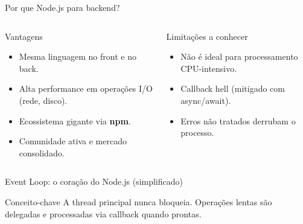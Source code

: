 \documentclass[aspectratio=169]{beamer}
\begin{document}
\begin{frame}{Por que Node.js para backend?}
\begin{columns}[T]
\begin{block}{Vantagens}
\begin{itemize}
  \item Mesma linguagem no front e no back.
  \item Alta performance em opera\c{c}\~oes I/O (rede, disco).
  \item Ecossistema gigante via \textbf{npm}.
  \item Comunidade ativa e mercado consolidado.
\end{itemize}
\end{block}
\begin{block}{Limita\c{c}\~oes a conhecer}
\begin{itemize}
  \item N\~ao \'{e} ideal para processamento CPU-intensivo.
  \item Callback hell (mitigado com async/await).
  \item Erros n\~ao tratados derrubam o processo.
\end{itemize}
\end{block}
\end{columns}
\end{frame}

\begin{frame}{Event Loop: o cora\c{c}\~ao do Node.js (simplificado)}
\begin{center}
\end{center}
\vspace{0.3em}
\begin{alertblock}{Conceito-chave}
A thread principal nunca bloqueia. Opera\c{c}\~oes lentas s\~ao delegadas e processadas via callback quando prontas.
\end{alertblock}
\end{frame}
\end{document}
